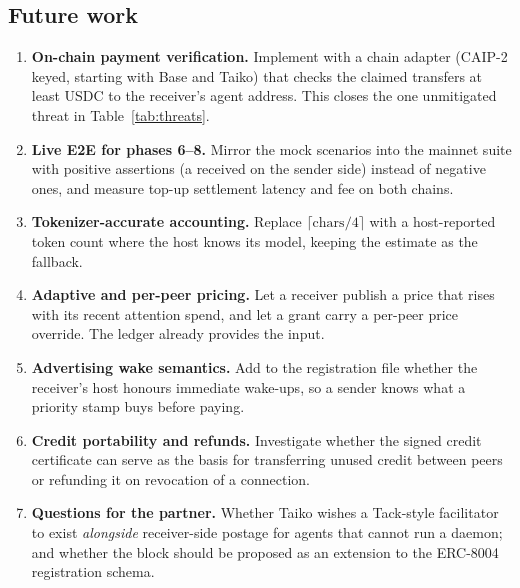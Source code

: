 \subsection{Future work}
\label{sec:future-work}

\begin{enumerate}
  \item \textbf{On-chain payment verification.} Implement  with a
        chain adapter (CAIP-2 keyed, starting with Base and Taiko) that checks the claimed
         transfers at least  USDC to the receiver's agent address.
        This closes the one unmitigated threat in Table~\ref{tab:threats}.
  \item \textbf{Live E2E for phases 6--8.} Mirror the mock scenarios into the mainnet suite
        with positive assertions (a received  on the sender side) instead of
        negative ones, and measure top-up settlement latency and fee on both chains.
  \item \textbf{Tokenizer-accurate accounting.} Replace $\lceil \text{chars}/4 \rceil$ with a
        host-reported token count where the host knows its model, keeping the estimate as the
        fallback.
  \item \textbf{Adaptive and per-peer pricing.} Let a receiver publish a price that rises
        with its recent attention spend, and let a grant carry a per-peer price override.
        The ledger already provides the input.
  \item \textbf{Advertising wake semantics.} Add to the registration file whether the
        receiver's host honours immediate wake-ups, so a sender knows what a priority stamp
        buys before paying.
  \item \textbf{Credit portability and refunds.} Investigate whether the signed credit
        certificate can serve as the basis for transferring unused credit between peers or
        refunding it on revocation of a connection.
  \item \textbf{Questions for the partner.} Whether Taiko wishes a Tack-style facilitator to
        exist \emph{alongside} receiver-side postage for agents that cannot run a daemon; and
        whether the  block should be proposed as an extension to the
        ERC-8004 registration schema.
\end{enumerate}
